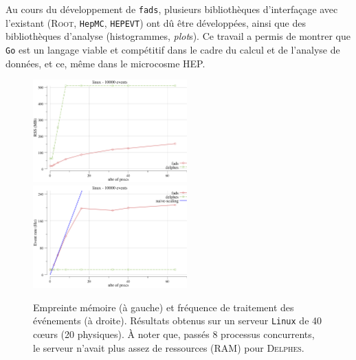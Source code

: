 \documentclass[a4paper,french]{article}
\begin{document}
Au cours du d\'eveloppement de \texttt{fads}, plusieurs biblioth\`eques
d'interfa\c cage avec l'existant (\textsc{Root}, \texttt{HepMC},
\texttt{HEPEVT}) ont d\^u \^etre d\'evelopp\'ees, ainsi que des biblioth\`eques
d'analyse (histogrammes, \emph{plot}s).
Ce travail a permis de montrer que \texttt{Go} est un langage viable et
comp\'etitif dans le cadre du calcul et de l'analyse de donn\'ees, et ce, m\^eme
dans le microcosme HEP.

\begin{figure}[h]
	\begin{center}
	\includegraphics[width=14pc]{figs/lhcb3-rss.png}
	\includegraphics[width=14pc]{figs/lhcb3-hz.png}
	\end{center}
	\caption{\label{fig-fads-delphes}Empreinte m\'emoire (\`a gauche) et
	fr\'equence de traitement des \'ev\'enements (\`a droite). R\'esultats
	obtenus sur un serveur \texttt{Linux} de 40 c\oe urs (20 physiques).
	\`A noter que, pass\'es 8 processus concurrents, le serveur n'avait plus
	assez de ressources (RAM) pour \textsc{Delphes}.}
\end{figure}
\end{document}

